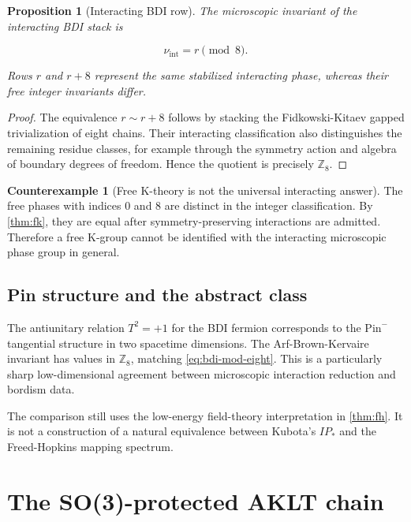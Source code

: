 \documentclass[12pt]{article}
\newtheorem{proposition}[theorem]{Proposition}
\theoremstyle{definition}
\newtheorem{counterexample}[theorem]{Counterexample}
\theoremstyle{remark}
\newcommand{\IP}{\mathit{IP}}
\begin{document}
\begin{proposition}[Interacting BDI row]
\label{prop:bdi-row}
The microscopic invariant of the interacting BDI stack is

\begin{equation}
  \nu_{\mathrm{int}}=r\pmod 8.
  \label{eq:bdi-mod-eight}
\end{equation}

Rows $r$ and $r+8$ represent the same stabilized interacting phase, whereas
their free integer invariants differ.
\end{proposition}

\begin{proof}
The equivalence $r\sim r+8$ follows by stacking the Fidkowski-Kitaev gapped
trivialization of eight chains.  Their interacting classification also
distinguishes the remaining residue classes, for example through the
symmetry action and algebra of boundary degrees of freedom.  Hence the
quotient is precisely $\mathbb Z_8$.
\end{proof}

\begin{counterexample}[Free K-theory is not the universal interacting answer]
The free phases with indices $0$ and $8$ are distinct in the integer
classification.  By \cref{thm:fk}, they are equal after symmetry-preserving
interactions are admitted.  Therefore a free K-group cannot be identified
with the interacting microscopic phase group in general.
\end{counterexample}

\subsection{Pin structure and the abstract class}

The antiunitary relation $T^2=+1$ for the BDI fermion corresponds to the
$\mathrm{Pin}^-$ tangential structure in two spacetime dimensions.  The
Arf-Brown-Kervaire invariant has values in $\mathbb Z_8$, matching
\cref{eq:bdi-mod-eight}.  This is a particularly sharp low-dimensional
agreement between microscopic interaction reduction and bordism data.

The comparison still uses the low-energy field-theory interpretation in
\cref{thm:fh}.  It is not a construction of a natural equivalence between
Kubota's $\IP_*$ and the Freed-Hopkins mapping spectrum.

\section{The SO(3)-protected AKLT chain}
\label{sec:aklt}
\end{document}
